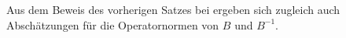 \begin{Satz}
\begin{Beweis}


    \end{Beweis}
\end{Satz}

Aus dem Beweis des vorherigen Satzes bei \textcite{Schwab:2009ec} ergeben sich zugleich auch Abschätzungen für die Operatornormen von $B$ und $B^{-1}$.


